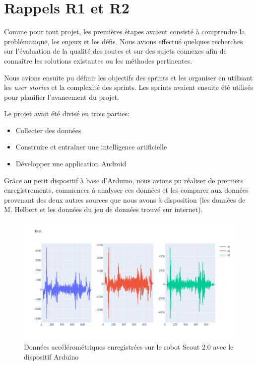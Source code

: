 \section{Rappels R1 et R2}
Comme pour tout projet, les premières étapes avaient consisté à comprendre la problématique, les enjeux et les défis.
Nous avions effectué quelques recherches sur l'évaluation de la qualité des routes et sur des sujets connexes afin de connaître les solutions existantes ou les méthodes pertinentes.

Nous avions ensuite pu définir les objectifs des sprints et les organiser en utilisant les \textit{user stories} et la complexité des sprints. Les sprints avaient ensuite été utilisés pour planifier l'avancement du projet.

Le projet avait été divisé en trois parties:
\begin{itemize}
    \item Collecter des données
    \item Construire et entraîner une intelligence artificielle
    \item Développer une application Android
\end{itemize}

Grâce au petit dispositif à base d'Arduino, nous avions pu réaliser de premiers enregistrements, commencer à analyser ces données et les comparer aux données provenant des deux autres sources que nous avons à disposition (les données de M. Helbert et les données du jeu de données trouvé sur internet).

\begin{figure}
    \center
    \includegraphics[scale=0.5]{img/DATA9.png}
    \caption{Données accélérométriques enregistrées sur le robot Scout 2.0 avec le dispositif Arduino}
    \label{bump_1}
\end{figure}

